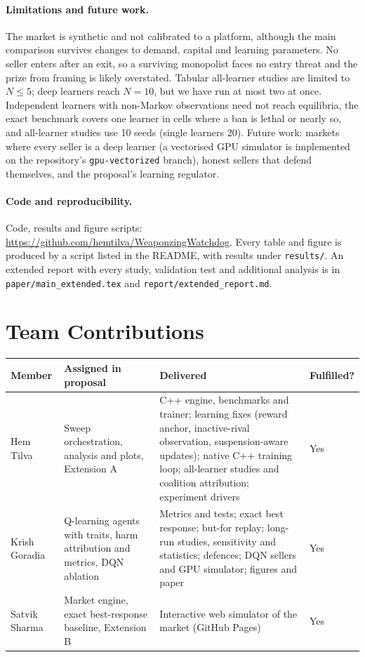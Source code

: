 \documentclass{article}
\begin{document}
\paragraph{Limitations and future work.} The market is synthetic and not calibrated to a platform, although the main comparison survives changes to demand, capital and learning parameters. No seller enters after an exit, so a surviving monopolist faces no entry threat and the prize from framing is likely overstated. Tabular all-learner studies are limited to $N\le5$; deep learners reach $N=10$, but we have run at most two at once. Independent learners with non-Markov observations need not reach equilibria, the exact benchmark covers one learner in cells where a ban is lethal or nearly so, and all-learner studies use 10 seeds (single learners 20). Future work: markets where every seller is a deep learner (a vectorised GPU simulator is implemented on the repository's \texttt{gpu-vectorized} branch), honest sellers that defend themselves, and the proposal's learning regulator.

\paragraph{Code and reproducibility.} Code, results and figure scripts: \url{https://github.com/hemtilva/WeaponzingWatchdog}. Every table and figure is produced by a script listed in the README, with results under \texttt{results/}. An extended report with every study, validation test and additional analysis is in \texttt{paper/main\_extended.tex} and \texttt{report/extended\_report.md}.

\section{Team Contributions}

{\small\noindent\begin{tabularx}{\linewidth}{@{}lXXl@{}}
\toprule
Member & Assigned in proposal & Delivered & Fulfilled? \\
\midrule
Hem Tilva & Sweep orchestration, analysis and plots, Extension A & C++ engine, benchmarks and trainer; learning fixes (reward anchor, inactive-rival observation, suspension-aware updates); native C++ training loop; all-learner studies and coalition attribution; experiment drivers & Yes \\
Krish Goradia & Q-learning agents with traits, harm attribution and metrics, DQN ablation & Metrics and tests; exact best response; but-for replay; long-run studies, sensitivity and statistics; defences; DQN sellers and GPU simulator; figures and paper & Yes \\
Satvik Sharma & Market engine, exact best-response baseline, Extension B & Interactive web simulator of the market (GitHub Pages) & Yes \\
\bottomrule
\end{tabularx}}

{\small

}
\end{document}
